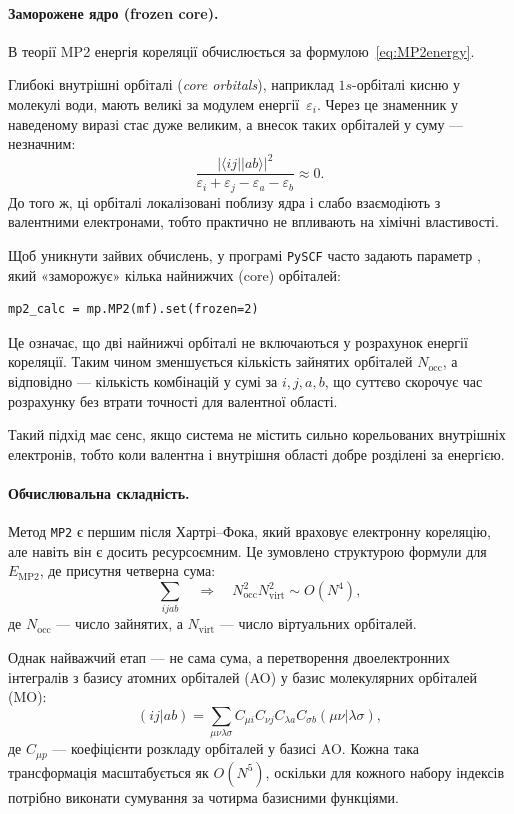 \paragraph{Заморожене ядро (frozen core).}

В теорії MP2 енергія кореляції обчислюється за формулою~\eqref{eq:MP2energy}.

Глибокі внутрішні орбіталі (\emph{core orbitals}), наприклад \(1s\)-орбіталі кисню у молекулі води,
мають великі за модулем енергії~\(\varepsilon_i\).
Через це знаменник у наведеному виразі стає дуже великим, а внесок таких орбіталей у суму --- незначним:
\[
	\frac{|\langle ij || ab \rangle|^2}
	{\varepsilon_i + \varepsilon_j - \varepsilon_a - \varepsilon_b} \approx 0.
\]
До того ж, ці орбіталі локалізовані поблизу ядра і слабо взаємодіють з валентними електронами,
тобто практично не впливають на хімічні властивості.

Щоб уникнути зайвих обчислень, у програмі \texttt{PySCF} часто задають параметр
, який «заморожує» кілька найнижчих (core) орбіталей:
\begin{verbatim}
mp2_calc = mp.MP2(mf).set(frozen=2)
\end{verbatim}
Це означає, що дві найнижчі орбіталі не включаються у розрахунок енергії кореляції.
Таким чином зменшується кількість зайнятих орбіталей \(N_\text{occ}\),
а відповідно --- кількість комбінацій у сумі за \(i,j,a,b\),
що суттєво скорочує час розрахунку без втрати точності для валентної області.

Такий підхід має сенс, якщо система не містить сильно корельованих внутрішніх електронів,
тобто коли валентна і внутрішня області добре розділені за енергією.

\paragraph{Обчислювальна складність.}

Метод \texttt{MP2} є першим після Хартрі–Фока, який враховує електронну кореляцію,
але навіть він є досить ресурсоємним.
Це зумовлено структурою формули для \(E_{\text{MP2}}\), де присутня четверна сума:
\[
	\sum_{ijab} \quad \Rightarrow \quad
	N_\text{occ}^2 N_\text{virt}^2 \sim O(N^4),
\]
де \(N_\text{occ}\) --- число зайнятих, а \(N_\text{virt}\) --- число віртуальних орбіталей.

Однак найважчий етап --- не сама сума, а перетворення двоелектронних інтегралів
з базису атомних орбіталей (AO) у базис молекулярних орбіталей (MO):
\begin{equation}
	(ij|ab) =
	\sum_{\mu\nu\lambda\sigma}
	C_{\mu i} C_{\nu j} C_{\lambda a} C_{\sigma b}
	(\mu\nu|\lambda\sigma),
\end{equation}
де \(C_{\mu p}\) --- коефіцієнти розкладу орбіталей у базисі AO.
Кожна така трансформація масштабується як \(O(N^5)\),
оскільки для кожного набору індексів потрібно виконати сумування за чотирма базисними функціями.

